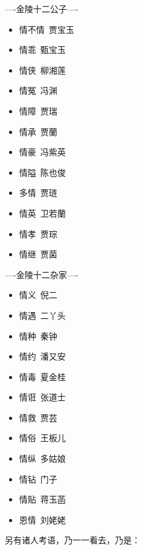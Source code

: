 \documentclass[12pt,oneside]{book}
\begin{document}
----金陵十二公子----


\begin{itemize}
\item 情不情~贾宝玉
\item 情乖~甄宝玉
\item 情侠~柳湘莲
\item 情冤~冯渊
\item 情障~贾瑞 
\item 情承~贾蘭
\item 情豪~冯紫英
\item 情隘~陈也俊
\item 多情~贾琏
\item 情英~卫若蘭
\item 情孝~贾琮
\item 情继~贾菌 
\end{itemize}



----金陵十二杂家----


\begin{itemize}
\item 情义~倪二
\item 情遇~二丫头
\item 情种~秦钟
\item 情约~潘又安 
\item 情毒~夏金桂
\item 情诳~张道士
\item 情救~贾芸
\item 情俗~王板儿 
\item 情纵~多姑娘
\item 情钻~门子
\item 情贴~蒋玉菡
\item 恩情~刘姥姥
\end{itemize}



另有诸人考语，乃一一看去，乃是： 
\end{document}
